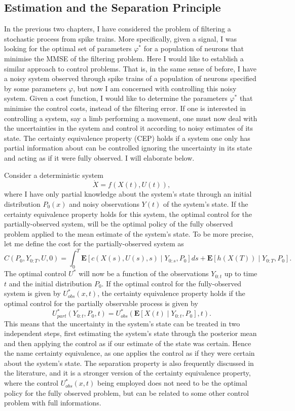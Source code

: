 \subsection{Estimation and the Separation Principle}

In the previous two chapters, I have considered the problem of filtering a stochastic process from spike trains. More specifically, given a signal, I was looking for the optimal set of 
parameters $\varphi^*$ for a population of neurons that minimise the MMSE of the filtering problem. Here I would like to establish a similar approach to control problems. That is,
in the same sense of before, I have a noisy system observed through spike trains of a population of neurons specified by some parameters $\varphi$, but now I am concerned with
controlling this noisy system. Given a cost function, I would like to determine the parameters $\varphi^*$ that minimise the control costs, instead of the filtering error.
If one is interested in controlling a system, say a limb performing a movement, one must now deal with the uncertainties in the system and control it according to noisy estimates of its 
state. The certainty equivalence property (CEP) holds if a system one only has partial information about can be controlled ignoring the uncertainty in its state and acting as if it were 
fully observed. I will elaborate below.
\par

Consider a deterministic system
\[
\dot{X} = f(X(t),U(t)),
\]
where I have only partial knowledge about the system's state through an initial distribution $P_0(x)$ and noisy observations $Y(t)$ of the system's state. If the certainty 
equivalence property holds for this system, the optimal control for the partially-observed system, will be the optimal policy of the fully observed problem applied to the mean estimate
of the system's state. To be more precise, let me define the cost for the partially-observed system as
\[
C(P_0,Y_{0:T},U,0) = \int_0^T \boldsymbol{E}  \left[c(X(s),U(s),s) \mid Y_{0:s},P_0 \right]ds + \boldsymbol{E} \left[h(X(T))\mid Y_{0:T},P_0\right].
\]
The optimal control $U^*$ will now be a function of the observations $Y_{0:t}$ up to time $t$ and the initial distribution $P_0$. If the optimal control for the fully-observed system is 
given by $U^*_{obs}(x,t)$, the certainty equivalence property holds if the optimal control for the partially observable process is given by 
$$
U^*_{part} (Y_{0:t},P_0,t) =  U^*_{obs}\left(\boldsymbol{E}\left[X(t) \mid Y_{0:t},P_0\right],t\right).
$$
This means that the uncertainty in the system's state can be treated in two independent steps, first estimating the system's state through the posterior mean and then applying the
control as if our estimate of the state was certain. Hence the name certainty equivalence, as one applies the control as if they were certain about the system's state.
The separation property is also frequently discussed in the literature, and it is a stronger version of the certainty equivalence property, where the control $U^*_{obs}(x,t)$ being 
employed does not need
to be the optimal policy for the fully observed problem, but can be related to some other control problem with full informations.\par

